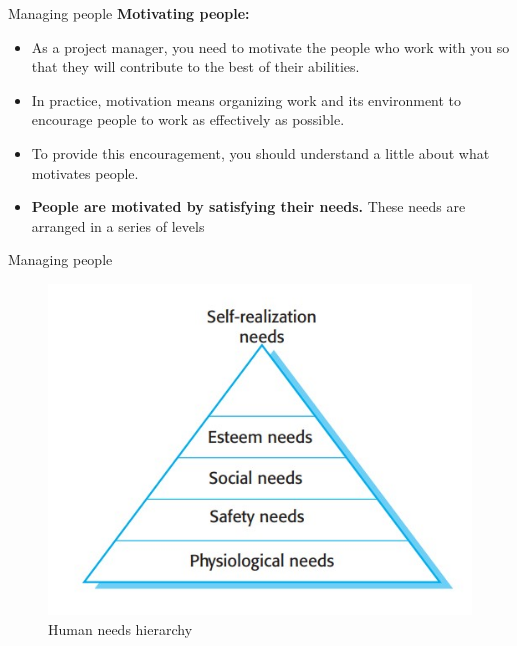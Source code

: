 \documentclass{beamer}
\begin{document}
\begin{frame}{Managing people}
\textbf{Motivating people:}
\begin{itemize}
	\item As a project manager, you need to motivate the people who work 
	with you so that they will contribute to the best of their abilities. 
	\item In practice, motivation means organizing work and its environment to 
	encourage people to work as effectively as possible.
	\item To provide this encouragement, you should understand a little about 
	what motivates people.
	\item \textbf{People are motivated by satisfying their needs.} These needs are 
	arranged in a series of levels
\end{itemize}
\end{frame}
\begin{frame}{Managing people}

		\begin{figure}
			\includegraphics[scale=.45]{img/m4_3}
			\caption{Human 
				needs hierarchy
			}
		\end{figure}
\end{frame}
\end{document}
